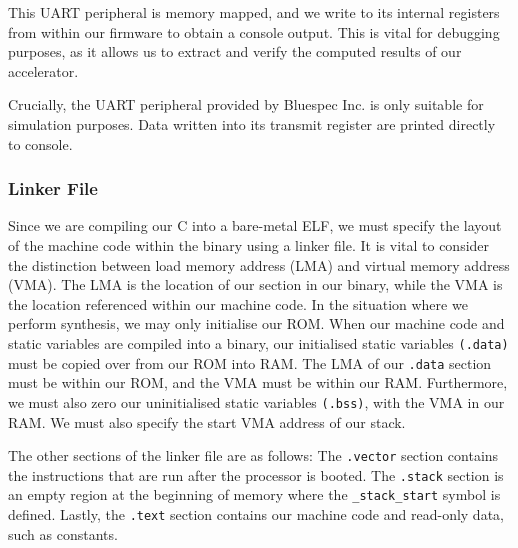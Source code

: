 \documentclass[a4paper,8pt]{report}
\begin{document}
This UART peripheral is memory mapped, and we write to its internal registers
from within our firmware to obtain a console output. This is vital for debugging
purposes, as it allows us to extract and verify the computed results of our
accelerator.

Crucially, the UART peripheral provided by Bluespec Inc. is only suitable for
simulation purposes. Data written into its transmit register are printed
directly to console. 

\subsubsection{Linker File}
Since we are compiling our C into a bare-metal ELF, we must specify the layout
of the machine code within the binary using a linker file\cite{linker-blog}.
It is vital to consider the distinction between load memory address (LMA) and
virtual memory address (VMA). The LMA is the location of our section in our
binary, while the VMA is the location
referenced within our machine code. In the situation where we perform synthesis,
we may only initialise our ROM. When our machine code and static variables are
compiled into a binary, our initialised static variables \texttt{(.data)} must
be copied over from our ROM into RAM. The LMA of our \texttt{.data} section must
be within our ROM, and the VMA must be within our RAM. Furthermore, we must also
zero our uninitialised static variables \texttt{(.bss)}, with the VMA in our
RAM. We must also specify the start VMA address of our stack.

The other sections of the linker file are as follows: The \texttt{.vector}
section contains the instructions that are run after the processor is booted.
The \texttt{.stack} section is an empty region at the beginning of memory
where the \texttt{\_stack\_start} symbol is defined. Lastly, the \texttt{.text}
section contains our machine code and read-only data, such as constants.
\end{document}
